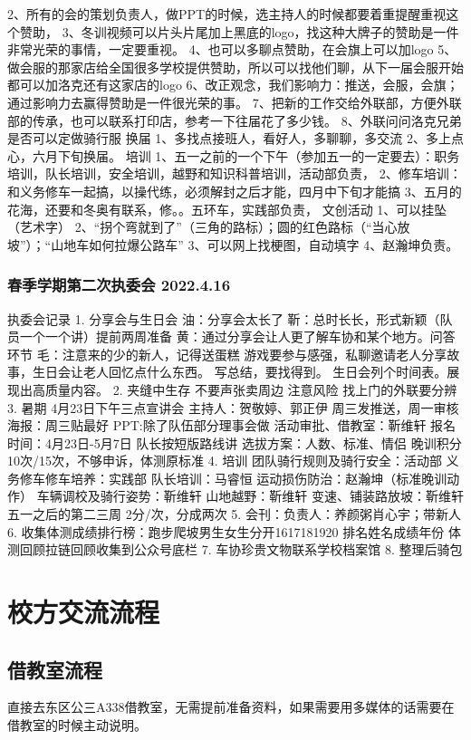 \documentclass{ctexbook}
\begin{document}
2、所有的会的策划负责人，做PPT的时候，选主持人的时候都要着重提醒重视这个赞助，
3、冬训视频可以片头片尾加上黑底的logo，找这种大牌子的赞助是一件非常光荣的事情，一定要重视。
4、也可以多聊点赞助，在会旗上可以加logo
5、做会服的那家店给全国很多学校提供赞助，所以可以找他们聊，从下一届会服开始都可以加洛克还有这家店的logo
6、改正观念，我们影响力：推送，会服，会旗；通过影响力去赢得赞助是一件很光荣的事。
7、把新的工作交给外联部，方便外联部的传承，也可以联系打印店，参考一下往届花了多少钱。
8、外联问问洛克兄弟是否可以定做骑行服
换届
1、多找点接班人，看好人，多聊聊，多交流
2、多上点心，六月下旬换届。
培训
1、五一之前的一个下午（参加五一的一定要去）：职务培训，队长培训，安全培训，越野和知识科普培训，活动部负责，
2、修车培训：和义务修车一起搞，以操代练，必须解封之后才能，四月中下旬才能搞
3、五月的花海，还要和冬奥有联系，修。。五环车，实践部负责，
文创活动
1、可以挂坠（艺术字）
2、“拐个弯就到了”（三角的路标）；圆的红色路标（“当心放坡”）；“山地车如何拉爆公路车”
3、可以网上找梗图，自动填字
4、赵瀚坤负责。


\subsection{春季学期第二次执委会 2022.4.16}
执委会记录
1.	分享会与生日会
油：分享会太长了
靳：总时长长，形式新颖（队员一个一个讲）提前两周准备
黄：通过分享会让人更了解车协和某个地方。问答环节
毛：注意来的少的新人，记得送蛋糕
游戏要参与感强，私聊邀请老人分享故事，生日会让老人回忆点什么东西。
写总结，要找得到。
生日会列个时间表。展现出高质量内容。
2.	夹缝中生存
不要声张卖周边	
注意风险
找上门的外联要分辨
3.	暑期
4月23日下午三点宣讲会
主持人：贺敬婷、郭正伊
周三发推送，周一审核
海报：周三贴最好  
PPT:除了队伍部分理事会做
活动审批、借教室：靳维轩
报名时间：4月23日-5月7日
队长按短版路线讲
选拔方案：人数、标准、情侣
晚训积分10次/15次，不够申诉，体测原标准
4.	培训
团队骑行规则及骑行安全：活动部
义务修车修车培养：实践部
队长培训：马睿恒
运动损伤防治：赵瀚坤（标准晚训动作）
车辆调校及骑行姿势：靳维轩
山地越野：靳维轩
变速、铺装路放坡：靳维轩
五一之后的第二三周
2分/次，分成两次
5.	会刊：负责人：养颜粥肖心宇；带新人
6.	收集体测成绩排行榜：跑步爬坡男生女生分开1617181920
排名姓名成绩年份
体测回顾拉链回顾收集到公众号底栏
7.	车协珍贵文物联系学校档案馆
8.	整理后骑包

\chapter{校方交流流程} 
\section{借教室流程}
直接去东区公三A338借教室，无需提前准备资料，如果需要用多媒体的话需要在借教室的时候主动说明。
\end{document}
